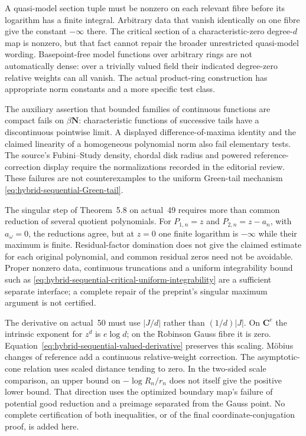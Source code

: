A quasi-model section tuple must be nonzero on each relevant fibre
before its logarithm has a finite integral. Arbitrary data that
vanish identically on one fibre give the constant $-\infty$ there.
The critical section of a characteristic-zero degree-$d$ map is
nonzero, but that fact cannot repair the broader unrestricted
quasi-model wording. Basepoint-free model functions over arbitrary
rings are not automatically dense: over a trivially valued field
their indicated degree-zero relative weights can all vanish.
The actual product-ring construction has appropriate norm constants
and a more specific test class.

The auxiliary assertion that bounded families of continuous functions
are compact fails on $\beta\mathbf N$: characteristic functions of
successive tails have a discontinuous pointwise limit. A displayed
difference-of-maxima identity and the claimed linearity of a
homogeneous polynomial norm also fail elementary tests. The
source's Fubini--Study density, chordal disk radius and powered
reference-correction display require the normalizations recorded
in the editorial review. These failures are not counterexamples
to the uniform Green-tail mechanism
\eqref{eq:hybrid-sequential-Green-tail}.

The singular step of Theorem~5.8 on actual~49 requires more than
common reduction of several quotient polynomials. For
$P_{1,n}=z$ and $P_{2,n}=z-a_n$, with $a_\omega=0$, the reductions
agree, but at $z=0$ one finite logarithm is $-\infty$ while their
maximum is finite. Residual-factor domination does not give the
claimed estimate for each original polynomial, and common residual
zeros need not be avoidable. Proper nonzero data, continuous
truncations and a uniform integrability bound such as
\eqref{eq:hybrid-sequential-critical-uniform-integrability}
are a sufficient separate interface; a complete repair of the
preprint's singular maximum argument is not certified.

The derivative on actual~50 must use $|J/d|$ rather than
$(1/d)|J|$. On $\mathbf C^e$ the intrinsic exponent for $z^d$
is $e\log d$; on the Robinson Gauss fibre it is zero.
Equation~\eqref{eq:hybrid-sequential-valued-derivative} preserves
this scaling. Möbius changes of reference add a continuous
relative-weight correction. The asymptotic-cone relation uses
scaled distance tending to zero. In the two-sided scale comparison,
an upper bound on $-\log R_n/r_n$ does not itself give the positive
lower bound. That direction uses the optimized boundary map's
failure of potential good reduction and a preimage separated from
the Gauss point. No complete certification of both inequalities,
or of the final coordinate-conjugation proof, is added here.


